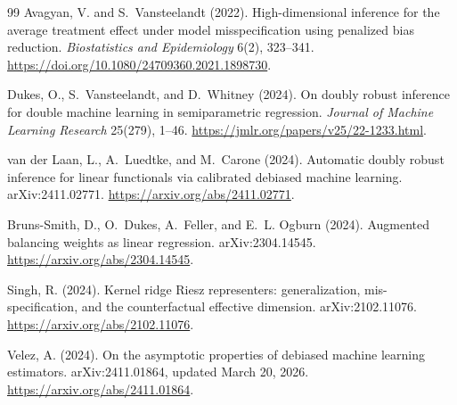 \documentclass[11pt]{article}
\theoremstyle{definition}
\theoremstyle{plain}
\theoremstyle{remark}
\begin{document}
\begin{thebibliography}{99}
Avagyan, V. and S.~Vansteelandt (2022).
\newblock High-dimensional inference for the average treatment effect under
model misspecification using penalized bias reduction.
\newblock \emph{Biostatistics and Epidemiology} 6(2), 323--341.
\newblock \url{https://doi.org/10.1080/24709360.2021.1898730}.

Dukes, O., S.~Vansteelandt, and D.~Whitney (2024).
\newblock On doubly robust inference for double machine learning in
semiparametric regression.
\newblock \emph{Journal of Machine Learning Research} 25(279), 1--46.
\newblock \url{https://jmlr.org/papers/v25/22-1233.html}.

van der Laan, L., A.~Luedtke, and M.~Carone (2024).
\newblock Automatic doubly robust inference for linear functionals via
calibrated debiased machine learning.
\newblock arXiv:2411.02771.
\newblock \url{https://arxiv.org/abs/2411.02771}.

Bruns-Smith, D., O.~Dukes, A.~Feller, and E.~L. Ogburn (2024).
\newblock Augmented balancing weights as linear regression.
\newblock arXiv:2304.14545.
\newblock \url{https://arxiv.org/abs/2304.14545}.

Singh, R. (2024).
\newblock Kernel ridge Riesz representers: generalization, mis-specification,
and the counterfactual effective dimension.
\newblock arXiv:2102.11076.
\newblock \url{https://arxiv.org/abs/2102.11076}.

Velez, A. (2024).
\newblock On the asymptotic properties of debiased machine learning estimators.
\newblock arXiv:2411.01864, updated March 20, 2026.
\newblock \url{https://arxiv.org/abs/2411.01864}.
\end{thebibliography}
\end{document}
